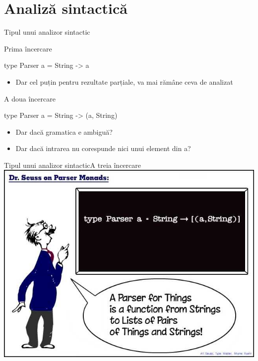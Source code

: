 \documentclass[xcolor=pdftex,romanian,colorlinks]{beamer}
\begin{document}
\section{Analiză sintactică}

\begin{frame}[fragile]{Tipul unui analizor sintactic}
\begin{block}
{Prima încercare}
\begin{asciihs}
   type Parser a = String -> a
\end{asciihs}
\begin{itemize}
\item Dar cel puțin pentru rezultate parțiale, va mai rămâne ceva de analizat
\end{itemize}
\end{block}
%
\begin{block}
{A doua încercare}
\begin{asciihs}
   type Parser a = String -> (a, String)
\end{asciihs}
\begin{itemize}
\item Dar dacă gramatica e ambiguă?
\item Dar dacă intrarea nu corespunde nici unui element din a?
\end{itemize}
\end{block}
\end{frame}


%
%
%
\begin{frame}[fragile]{Tipul unui analizor sintactic}{A treia încercare}
\hfill \href{http://www.willamette.edu/~fruehr/haskell/seuss.html}{\includegraphics[scale=.4]{SeussFinal2}}\hfill\;
\end{frame}
\end{document}
